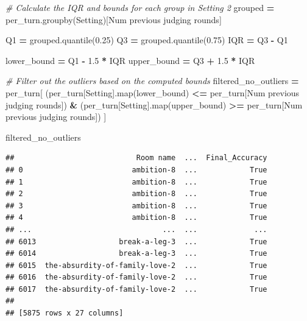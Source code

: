 \documentclass[
]{article}
\newenvironment{Shaded}{\begin{snugshade}}{\end{snugshade}}
\newcommand{\BuiltInTok}[1]{#1}
\newcommand{\CommentTok}[1]{\textcolor[rgb]{0.56,0.35,0.01}{\textit{#1}}}
\newcommand{\FloatTok}[1]{\textcolor[rgb]{0.00,0.00,0.81}{#1}}
\newcommand{\NormalTok}[1]{#1}
\newcommand{\OperatorTok}[1]{\textcolor[rgb]{0.81,0.36,0.00}{\textbf{#1}}}
\newcommand{\StringTok}[1]{\textcolor[rgb]{0.31,0.60,0.02}{#1}}
\begin{document}
\begin{Shaded}
\begin{Highlighting}[]
\CommentTok{\# Calculate the IQR and bounds for each group in \textquotesingle{}Setting 2\textquotesingle{}}
\NormalTok{grouped }\OperatorTok{=}\NormalTok{ per\_turn.groupby(}\StringTok{\textquotesingle{}Setting\textquotesingle{}}\NormalTok{)[}\StringTok{\textquotesingle{}Num previous judging rounds\textquotesingle{}}\NormalTok{]}

\NormalTok{Q1 }\OperatorTok{=}\NormalTok{ grouped.quantile(}\FloatTok{0.25}\NormalTok{)}
\NormalTok{Q3 }\OperatorTok{=}\NormalTok{ grouped.quantile(}\FloatTok{0.75}\NormalTok{)}
\NormalTok{IQR }\OperatorTok{=}\NormalTok{ Q3 }\OperatorTok{{-}}\NormalTok{ Q1}

\NormalTok{lower\_bound }\OperatorTok{=}\NormalTok{ Q1 }\OperatorTok{{-}} \FloatTok{1.5} \OperatorTok{*}\NormalTok{ IQR}
\NormalTok{upper\_bound }\OperatorTok{=}\NormalTok{ Q3 }\OperatorTok{+} \FloatTok{1.5} \OperatorTok{*}\NormalTok{ IQR}

\CommentTok{\# Filter out the outliers based on the computed bounds}
\NormalTok{filtered\_no\_outliers }\OperatorTok{=}\NormalTok{ per\_turn[}
\NormalTok{    (per\_turn[}\StringTok{\textquotesingle{}Setting\textquotesingle{}}\NormalTok{].}\BuiltInTok{map}\NormalTok{(lower\_bound) }\OperatorTok{\textless{}=}\NormalTok{ per\_turn[}\StringTok{\textquotesingle{}Num previous judging rounds\textquotesingle{}}\NormalTok{]) }\OperatorTok{\&}
\NormalTok{    (per\_turn[}\StringTok{\textquotesingle{}Setting\textquotesingle{}}\NormalTok{].}\BuiltInTok{map}\NormalTok{(upper\_bound) }\OperatorTok{\textgreater{}=}\NormalTok{ per\_turn[}\StringTok{\textquotesingle{}Num previous judging rounds\textquotesingle{}}\NormalTok{])}
\NormalTok{]}

\NormalTok{filtered\_no\_outliers}
\end{Highlighting}
\end{Shaded}

\begin{verbatim}
##                            Room name  ...  Final_Accuracy
## 0                         ambition-8  ...            True
## 1                         ambition-8  ...            True
## 2                         ambition-8  ...            True
## 3                         ambition-8  ...            True
## 4                         ambition-8  ...            True
## ...                              ...  ...             ...
## 6013                   break-a-leg-3  ...            True
## 6014                   break-a-leg-3  ...            True
## 6015  the-absurdity-of-family-love-2  ...            True
## 6016  the-absurdity-of-family-love-2  ...            True
## 6017  the-absurdity-of-family-love-2  ...            True
## 
## [5875 rows x 27 columns]
\end{verbatim}
\end{document}
